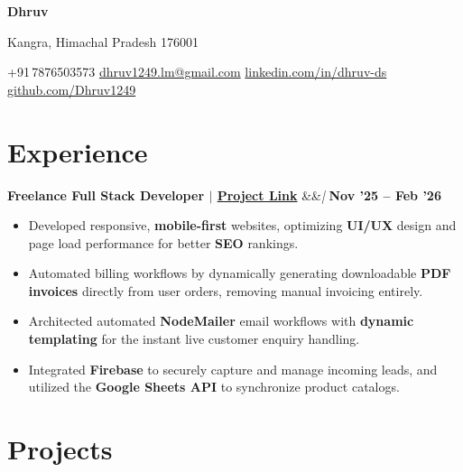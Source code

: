 \documentclass[letterpaper, 11pt]{article}
\newcommand{\cventry}[3]{%
  \noindent
  \textbf{#1}%
  \ifx&#2&\else\enspace\textit{| #2}\fi%
  \hfill\textbf{#3}\par
  \vspace{1pt}%
}
\begin{document}
\pagestyle{empty}

\begin{center}
  {\Huge\bfseries Dhruv}\par
  \vspace{2pt}
  Kangra, Himachal Pradesh 176001\par
  \vspace{2pt}
  {\small
\faPhone\enspace +91\,7876503573 \quad
\faEnvelope\enspace \href{mailto:dhruv1249.lm@gmail.com}{dhruv1249.lm@gmail.com} \quad
\faLinkedin\enspace \href{https://www.linkedin.com/in/dhruv-ds}{linkedin.com/in/dhruv-ds} \quad
\faGithub\enspace \href{https://github.com/Dhruv1249}{github.com/Dhruv1249}
}
\end{center}

\vspace{2pt}

\section{Experience}

\cventry{Freelance Full Stack Developer $|$ \href{https://varanasitoursindia.com/}{Project Link}}{}{Nov '25 -- Feb '26}
\begin{itemize}
 \item Developed responsive, \textbf{mobile-first} websites, optimizing \textbf{UI/UX} design and page load performance for better \textbf{SEO} rankings.
\item Automated billing workflows by dynamically generating downloadable \textbf{PDF invoices} directly from user orders, removing manual invoicing entirely.
\item Architected automated \textbf{NodeMailer} email workflows with \textbf{dynamic templating} for the instant live customer enquiry handling.
\item Integrated \textbf{Firebase} to securely capture and manage incoming leads, and utilized the \textbf{Google Sheets API} to synchronize product catalogs.
\end{itemize}


\section{Projects}
\end{document}
